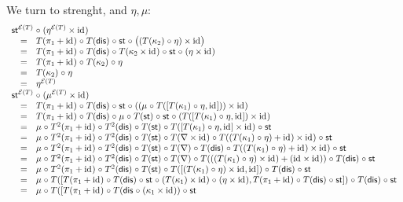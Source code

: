 \documentclass{LMCS}
\newcommand{\after}{\mathrel{\circ}}
\newcommand{\idmap}[1][]{\ensuremath{\mathrm{id}_{#1}}}
\newcommand{\st}{\ensuremath{\mathsf{st}}}
\newcommand{\dis}{\ensuremath{\mathsf{dis}}}
\newcommand{\E}{\ensuremath{\mathcal{E}}}
\begin{document}
{\noindent We turn to strenght, and $\eta,\mu$:
$$\begin{array}{rcl}
\lefteqn{\st^{\E(T)} \after (\eta^{\E(T)}\times\idmap)} \\
& = &
T(\pi_{1}+\idmap) \after T(\dis) \after \st \after 
   \big((T(\kappa_{2})\after \eta)\times\idmap\big) \\
& = &
T(\pi_{1}+\idmap) \after T(\dis) \after T(\kappa_{2}\times\idmap) \after
   \st \after (\eta\times\idmap) \\
& = &
T(\pi_{1}+\idmap) \after T(\kappa_{2}) \after \eta \\
& = &
T(\kappa_{2}) \after \eta \\
& = &
\eta^{\E(T)} \\
\lefteqn{\st^{\E(T)} \after (\mu^{\E(T)}\times\idmap)} \\
& = &
T(\pi_{1}+\idmap) \after T(\dis) \after \st \after 
   ((\mu \after T([T(\kappa_{1})\after\eta, \idmap]))\times\idmap) \\
& = &
T(\pi_{1}+\idmap) \after T(\dis) \after \mu \after  T(\st) \after \st
   \after (T([T(\kappa_{1})\after\eta, \idmap])\times\idmap) \\
& = &
\mu \after T^{2}(\pi_{1}+\idmap) \after T^{2}(\dis) \after T(\st) 
   \after T([T(\kappa_{1})\after\eta, \idmap]\times\idmap) \after \st \\
& = &
\mu \after T^{2}(\pi_{1}+\idmap) \after T^{2}(\dis) \after T(\st) 
   \after T(\nabla\times\idmap) \after
   T((T(\kappa_{1})\after\eta) + \idmap)\times\idmap) \after \st \\
& = &
\mu \after T^{2}(\pi_{1}+\idmap) \after T^{2}(\dis) \after T(\st) 
   \after T(\nabla) \after T(\dis) \after 
   T((T(\kappa_{1})\after\eta) + \idmap)\times\idmap) \after \st \\
& = &
\mu \after T^{2}(\pi_{1}+\idmap) \after T^{2}(\dis) \after T(\st) 
   \after T(\nabla) \after 
   T(((T(\kappa_{1})\after\eta)\times\idmap) + (\idmap\times\idmap))
   \after T(\dis) \after \st \\
& = &
\mu \after T^{2}(\pi_{1}+\idmap) \after T^{2}(\dis) \after T(\st) 
   \after T([(T(\kappa_{1})\after\eta)\times\idmap, \idmap])
   \after T(\dis) \after \st \\
& = &
\mu \after T([T(\pi_{1}+\idmap) \after T(\dis) \after \st
   \after (T(\kappa_{1})\times\idmap) \after (\eta\times\idmap), 
   T(\pi_{1}+\idmap) \after T(\dis) \after \st])
   \after T(\dis) \after \st \\
& = &
\mu \after T([T(\pi_{1}+\idmap) \after 
   T(\dis \after (\kappa_{1}\times\idmap)) \after \st

\end{array}$$}
\end{document}
